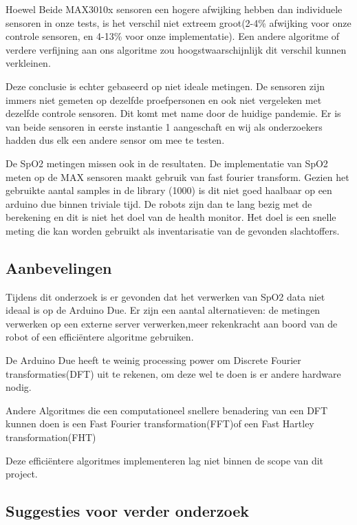 \documentclass[11pt]{article}
\begin{document}
Hoewel Beide MAX3010x sensoren een hogere afwijking hebben dan individuele sensoren in onze tests, is het verschil niet extreem groot(2-4\% afwijking voor onze controle sensoren, en 4-13\% voor onze implementatie). Een andere algoritme of verdere verfijning aan ons algoritme zou hoogstwaarschijnlijk dit verschil kunnen verkleinen.

Deze conclusie is echter gebaseerd op niet ideale metingen. De sensoren zijn immers niet gemeten op dezelfde proefpersonen en ook niet vergeleken met dezelfde controle sensoren. Dit komt met name door de huidige pandemie. Er is van beide sensoren in eerste instantie 1 aangeschaft en wij als onderzoekers hadden dus elk een andere sensor om mee te testen.

De SpO2 metingen missen ook in de resultaten. De implementatie van SpO2 meten op de MAX sensoren maakt gebruik van fast fourier transform. 
Gezien het gebruikte aantal samples in de library (1000) is dit niet goed haalbaar op een arduino due binnen triviale tijd. De robots zijn dan te lang bezig met de berekening en dit is niet het doel van de health monitor. Het doel is een snelle meting die kan worden gebruikt als inventarisatie van de gevonden slachtoffers. 





    \subsection{Aanbevelingen}\label{subsec:aanbevelingen}
Tijdens dit onderzoek is er gevonden dat het verwerken van SpO2 data niet ideaal is op de Arduino Due. Er zijn een aantal alternatieven:
de metingen verwerken op een externe server verwerken,meer rekenkracht aan boord van de robot of een efficiëntere algoritme gebruiken.

De Arduino Due heeft te weinig processing power om Discrete Fourier transformaties(DFT) uit te rekenen, om deze wel te doen is er andere hardware nodig.

Andere Algoritmes die een computationeel snellere benadering van een DFT kunnen doen is een Fast Fourier transformation(FFT)of een Fast Hartley transformation(FHT) 

Deze efficiëntere algoritmes implementeren lag niet binnen de scope van dit project.




    \subsection{Suggesties voor verder onderzoek}\label{subsec:suggesties-voor-verder-onderzoek}
\end{document}

